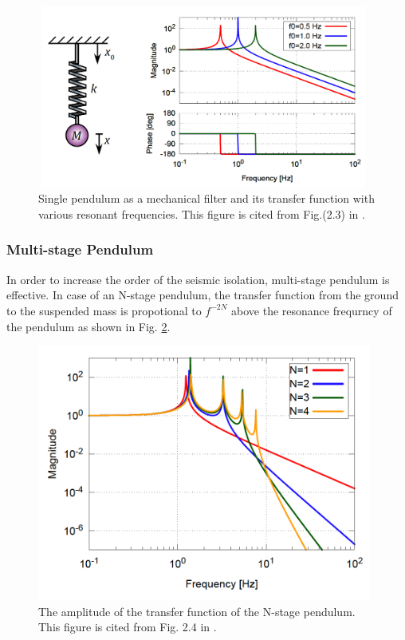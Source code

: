 \begin{figure}[h]
  \begin{center}   
    \includegraphics[width=11cm,height=6cm]{./img_chap5/img501.png}
    \caption{Single pendulum as a mechanical filter and its transfer function with various resonant frequencies. This figure is cited from Fig.(2.3) in \cite{sekiguchi2016astudy}.} \label{img:img501}
  \end{center}
\end{figure}

\subsubsection{Multi-stage Pendulum}
In order to increase the order of the seismic isolation, multi-stage pendulum is effective. In case of an N-stage pendulum, the transfer function from the ground to the suspended mass is propotional to $f^{-2N}$ above the resonance frequrncy of the pendulum as shown in Fig. \ref{img:img502}. 
\begin{figure}[h]
  \begin{center}   
    \includegraphics[width=11cm]{./img_chap5/img502.png}
    \caption{The amplitude of the transfer function of the N-stage pendulum. This figure is cited from Fig. 2.4 in \cite{sekiguchi2016astudy}.} \label{img:img502}
  \end{center}
\end{figure}

